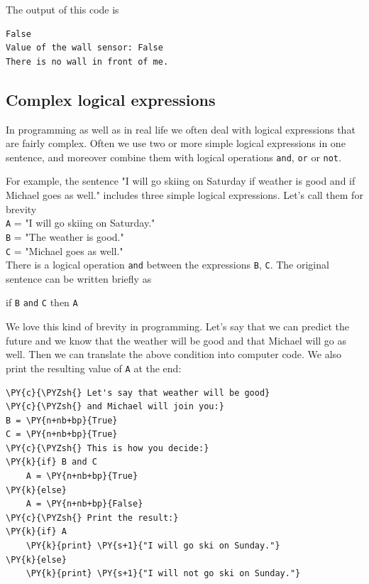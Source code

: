 \noindent
The output of this code is \\

\begin{ybox}
\begin{Verbatim}[commandchars=\\\{\}]
False
Value of the wall sensor: False
There is no wall in front of me.
\end{Verbatim}
\end{ybox}

\subsection[\ \ Complex logical expressions]{Complex logical expressions}

In programming as well as in real life we often deal with logical expressions that are 
fairly complex. Often we use two or more simple logical expressions in one sentence, 
and moreover combine them with logical operations {\tt and}, {\tt or} or {\tt not}.

For example, the sentence "I will go skiing on Saturday if weather is good and if 
Michael goes as well." includes three simple logical expressions. Let's call 
them for brevity\\

\noindent
{\tt A} = "I will go skiing on Saturday."\\
{\tt B} = "The weather is good."\\
{\tt C} = "Michael goes as well."\\

\noindent
There is a logical operation {\tt and} between the expressions {\tt B}, {\tt C}.
The original sentence can be written briefly as \\

\centerline{
if {\tt B} {\tt and} {\tt C} then {\tt A}
}
\vspace{4mm}
\noindent
We love this kind of brevity in programming. Let's say that we can 
predict the future and we know that the weather will be good and that 
Michael will go as well. Then we can translate the above condition 
into computer code. We also print the resulting value of {\tt A}
at the end:\\

\begin{bbox}
\begin{Verbatim}[commandchars=\\\{\}]
\PY{c}{\PYZsh{} Let's say that weather will be good}
\PY{c}{\PYZsh{} and Michael will join you:}
B = \PY{n+nb+bp}{True}
C = \PY{n+nb+bp}{True}
\PY{c}{\PYZsh{} This is how you decide:}
\PY{k}{if} B and C
    A = \PY{n+nb+bp}{True}
\PY{k}{else}
    A = \PY{n+nb+bp}{False}
\PY{c}{\PYZsh{} Print the result:}
\PY{k}{if} A
    \PY{k}{print} \PY{s+1}{"I will go ski on Sunday."}
\PY{k}{else}
    \PY{k}{print} \PY{s+1}{"I will not go ski on Sunday."}
\end{Verbatim}
\end{bbox}
\vspace{6mm}


